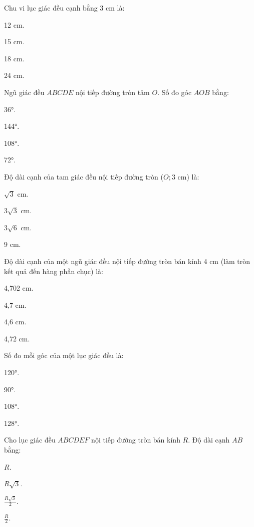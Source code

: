 \documentclass[%
    fontsize=12pt,%
    chapterprefix=false,%
    open=right,%
    twoside=false,%
    numbers=noenddot,%
    headings=optiontohead,%
    final,%
    DIV=15,%
    parskip=half %
]{scrbook}
\begin{document}
\begin{tracnghiem}

\item Chu vi lục giác đều cạnh bằng 3 cm là:
\begin{options}
  \item 12 cm.
  \item 15 cm.
  \item 18 cm.
  \item 24 cm.
\end{options}

\item Ngũ giác đều $ ABCDE $ nội tiếp đường tròn tâm $ O $. Số đo góc $ AOB $ bằng:
\begin{options}
  \item 36°.
  \item 144°.
  \item 108°.
  \item 72°.
\end{options}

\item Độ dài cạnh của tam giác đều nội tiếp đường tròn ($ O; 3 $ cm) là:
\begin{options}
  \item $ \sqrt{3} $ cm.
  \item $ 3\sqrt{3} $ cm.
  \item $ 3\sqrt{6} $ cm.
  \item 9 cm.
\end{options}

\item Độ dài cạnh của một ngũ giác đều nội tiếp đường tròn bán kính 4 cm (làm tròn kết quả đến hàng phần chục) là:
\begin{options}
  \item 4,702 cm.
  \item 4,7 cm.
  \item 4,6 cm.
  \item 4,72 cm.
\end{options}

\item Số đo mỗi góc của một lục giác đều là:
\begin{options}
  \item 120°.
  \item 90°.
  \item 108°.
  \item 128°.
\end{options}

\item Cho lục giác đều $ ABCDEF $ nội tiếp đường tròn bán kính $ R $. Độ dài cạnh $ AB $ bằng:
\begin{options}
  \item $ R $.
  \item $ R\sqrt{3} $.
  \item $ \frac{R\sqrt{3}}{2} $.
  \item $ \frac{R}{2} $.
\end{options}


\end{tracnghiem}
\end{document}
